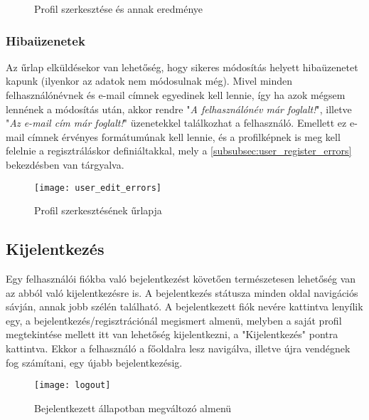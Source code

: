 \begin{figure}[H]
	\centering
	\hspace{5pt}
	\caption{Profil szerkesztése és annak eredménye}
	\label{fig:user_edit}
\end{figure}

\subsubsection{Hibaüzenetek}

Az űrlap elküldésekor van lehetőség, hogy sikeres módosítás helyett hibaüzenetet kapunk (ilyenkor az adatok nem módosulnak  még). Mivel minden felhasználónévnek és e-mail címnek egyedinek kell lennie, így ha azok mégsem lennének a módosítás után, 
akkor rendre "\textit{A felhasználónév már foglalt!}", illetve "\textit{Az e-mail cím már foglalt!}" üzenetekkel találkozhat a felhasználó. Emellett ez e-mail címnek érvényes formátumúnak kell lennie, és a profilképnek is meg kell felelnie a regisztráláskor definiáltakkal, mely a \ref{subsubsec:user_register_errors} bekezdésben van tárgyalva.

\begin{figure}[H]
	\centering
	\texttt{[image: user\_edit\_errors]}
	\caption{Profil szerkesztésének űrlapja}
	\label{fig:user_edit_errors}
\end{figure}

\subsection{Kijelentkezés}
\label{subsec:logout}

Egy felhasználói fiókba való bejelentkezést követően természetesen lehetőség van az abból való kijelentkezésre is. A bejelentkezés státusza minden oldal navigációs sávján, annak jobb szélén található. A bejelentkezett fiók nevére kattintva lenyílik egy, a bejelentkezés/regisztrációnál megismert almenü, melyben a saját profil megtekintése mellett itt van lehetőség kijelentkezni, a "Kijelentkezés" pontra kattintva. Ekkor a felhasználó a főoldalra lesz navigálva, illetve újra vendégnek fog számítani, egy újabb bejelentkezésig.

\begin{figure}[H]
	\centering
	\texttt{[image: logout]}
	\caption{Bejelentkezett állapotban megváltozó almenü}
	\label{fig:logout}
\end{figure}


